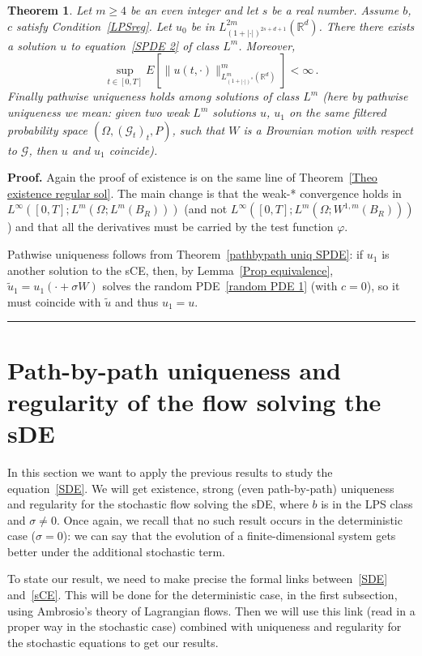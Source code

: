 \documentclass[a4paper,10pt]{article}
\newtheorem{theorem}{Theorem}
\newenvironment{proof}[1][Proof]{\noindent\textbf{#1.} }{\ \rule{0.5em}{0.5em}}
\newcommand{\mr}{\mathbb{R}}
\newcommand{\mc}{\mathcal}
\newcommand{\td}{\tilde}
\begin{document}
\begin{theorem}\label{existence CE}
Let $m \geq 4$ be an even integer and let $s$ be a real number. Assume $b$, $c$ satisfy Condition~\ref{LPSreg}. Let $u_0$ be in $L^{2m}_{(1+|\cdot|)^{2s+d+1}}(\mr^d)$. There there exists a solution $u$ to equation~\eqref{SPDE 2} of class $L^m$. Moreover,
\begin{equation*}
\sup_{t\in[0,T]}E\left[\|u(t,\cdot)\|_{L^m_{(1+|\cdot|)^s}(\mr^d)}^m\right] <\infty \,.
\end{equation*}
Finally pathwise uniqueness holds among solutions of class $L^m$ (here by pathwise uniqueness we mean: given two weak $L^m$ solutions $u$, $u_1$ on the same filtered probability space $(\Omega,(\mc{G}_t)_t,P)$, such that $W$ is a Brownian motion with respect to $\mc{G}$, then $u$ and $u_1$ coincide).
\end{theorem}

\begin{proof}
Again the proof of existence is on the same line of Theorem~\ref{Theo existence regular sol}. The main change is that the weak-* convergence holds in $L^\infty([0,T];L^m(\Omega;L^m(B_R)))$ (and not $L^\infty([0,T];L^m(\Omega;W^{1,m}(B_R)))$) and that all the derivatives must be carried by the test function $\varphi$.

Pathwise uniqueness follows from Theorem~\ref{pathbypath uniq SPDE}: if $u_1$ is another solution to the sCE, then, by Lemma~\ref{Prop equivalence}, $\td{u}_1=u_1(\cdot+\sigma W)$ solves the random PDE~\eqref{random PDE 1} (with $c=0$), so it must coincide with $\td{u}$ and thus $u_1=u$.
\end{proof}


\section{Path-by-path uniqueness and regularity of the flow solving the sDE}\label{section flow}

In this section we want to apply the previous results to study the equation~\eqref{SDE}. We will get existence, strong (even path-by-path) uniqueness and regularity for the stochastic flow solving the sDE, where $b$ is in the LPS class and $\sigma\neq0$. Once again, we recall that no such result occurs in the deterministic case ($\sigma=0$): we can say that the evolution of a finite-dimensional system gets better under the additional stochastic term.

To state our result, we need to make precise the formal links between~\eqref{SDE} and~\eqref{sCE}. This will be done for the deterministic case, in the first subsection, using Ambrosio's theory of Lagrangian flows. Then we will use this link (read in a proper way in the stochastic case) combined with uniqueness and regularity for the stochastic equations to get our results.
\end{document}
